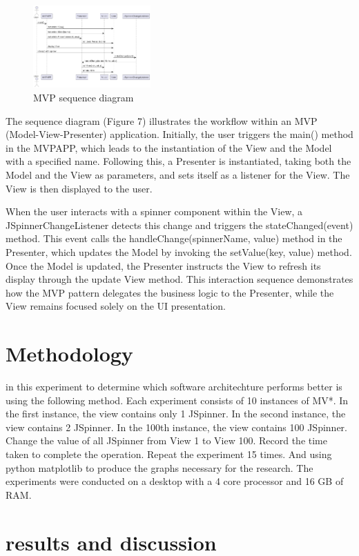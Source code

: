 \documentclass[conference]{IEEEtran}
\begin{document}
\begin{figure}
    [h]
    \centering
    \includegraphics[width = 0.4\textwidth]{Image/mvp_sequence_diagram.png}
    \caption{MVP sequence diagram}
    \label{fig:enter-label}
\end{figure}
The sequence diagram (Figure 7) illustrates the workflow within an MVP (Model-View-Presenter) application. Initially, the user triggers the main() method in the MVPAPP, which leads to the instantiation of the View and the Model with a specified name. Following this, a Presenter is instantiated, taking both the Model and the View as parameters, and sets itself as a listener for the View. The View is then displayed to the user.

When the user interacts with a spinner component within the View, a JSpinnerChangeListener detects this change and triggers the stateChanged(event) method. This event calls the handleChange(spinnerName, value) method in the Presenter, which updates the Model by invoking the setValue(key, value) method. Once the Model is updated, the Presenter instructs the View to refresh its display through the update View method. This interaction sequence demonstrates how the MVP pattern delegates the business logic to the Presenter, while the View remains focused solely on the UI presentation.
\section{Methodology}
in this experiment to determine which software architechture performs better is using the following method. Each experiment consists of 10 instances of MV*. In the first instance, the view contains only 1 JSpinner. In the second instance, the view contains 2 JSpinner. In the 100th instance, the view contains 100 JSpinner. Change the value of all JSpinner from View 1 to View 100. Record the time taken to complete the operation. Repeat the experiment 15 times. And using python matplotlib to produce the graphs necessary for the research.
The experiments were conducted on a desktop with a 4 core processor and 16 GB of RAM.
\section{results and discussion}
\end{document}
